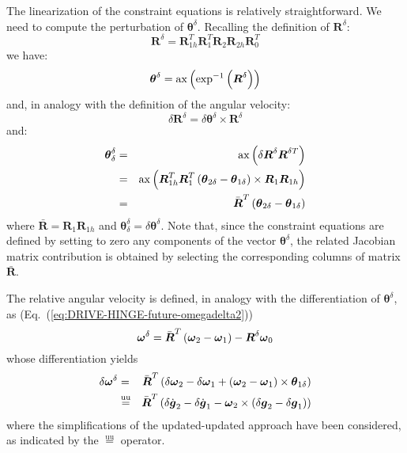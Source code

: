 \documentclass[10pt,dvips,fleqn]{report}
\newcommand{\T}[1]{\boldsymbol{#1}}
\newcommand{\equu}{\overset{\mathrm{uu}}{=}}
\begin{document}
\noindent
The linearization of the constraint equations is relatively 
straightforward. 
We need to compute the perturbation of $\T{\theta}^{\delta}$.
Recalling the definition of $\T{R}^{\delta}$:
\begin{equation*}
	\T{R}^{\delta} = \T{R}_{1h}^T \T{R}_1^T \T{R}_2 \T{R}_{2h} \T{R}_0^T
\end{equation*}
we have:
\begin{equation*}
	\T{\theta}^{\delta} = \llk{ax}\plbr{\exp^{-1}\plbr{\T{R}^{\delta}}}
\end{equation*}
and, in analogy with the definition of the angular velocity:
\begin{equation*}
	\delta \T{R}^{\delta} = \delta \T{\theta}^{\delta} \times \T{R}^{\delta}
\end{equation*}
and:
\begin{eqnarray*}
	\T{\theta}^{\delta}_{\delta}
	& = & \llk{ax}\plbr{\delta\T{R}^{\delta} \T{R}^{\delta T}} \\
	& = & \llk{ax}\plbr{\T{R}_{1h}^T \T{R}_1^T
		\plbr{\T{\theta}_{2\delta} - \T{\theta}_{1\delta}}\times{}
		\T{R}_1 \T{R}_{1h}} \\
	& = & \bar{\T{R}}^T\plbr{\T{\theta}_{2\delta} - \T{\theta}_{1\delta}}
\end{eqnarray*}
where $\bar{\T{R}}=\T{R}_1 \T{R}_{1h}$ and $\T{\theta}^{\delta}_{\delta} = {\delta}\T{\theta}^{\delta}$.
Note that, since the constraint equations are defined by setting 
to zero any components of the vector $\T{\theta}^{\delta}$, the
related Jacobian matrix contribution is obtained by selecting 
the corresponding columns of matrix $\bar{\T{R}}$.

\noindent
The relative angular velocity is defined, in analogy with 
the differentiation of $\T{\theta}^{\delta}$, as (Eq.~(\ref{eq:DRIVE-HINGE-future-omegadelta2}))
\begin{equation*}
\T{\omega}^{\delta} = \bar{\T{R}}^T\plbr{\T{\omega}_2 - \T{\omega}_1} - \T{R}^{\delta}\T{\omega}_0
\end{equation*}
whose differentiation yields
\begin{eqnarray*}
	\delta\T{\omega}^{\delta}
	& = & \bar{\T{R}}^T \plbr{
		\delta\T{\omega}_2
		- \delta\T{\omega}_1
		+ \plbr{\T{\omega}_2 - \T{\omega}_1}\times
			\T{\theta}_{1\delta}
	} \\
	& \equu & \bar{\T{R}}^T \plbr{
		\delta\dot{\T{g}}_2
		- \delta\dot{\T{g}}_1
		- \T{\omega}_2\times\plbr{\delta\T{g}_2 - \delta\T{g}_1}
	}
\end{eqnarray*}
where the simplifications of the updated-updated approach 
have been considered, as indicated by the $\equu$ operator.
\end{document}
